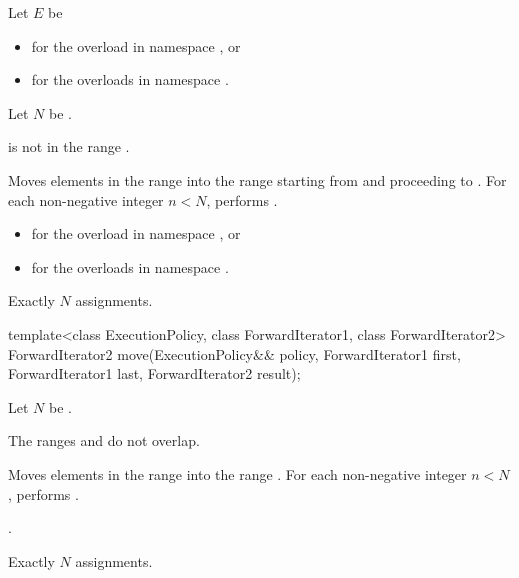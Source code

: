 \begin{itemdescr}
\pnum
Let $E$ be
\begin{itemize}
\item
  for the overload in namespace , or
\item
  for the overloads in namespace .
\end{itemize}
Let $N$ be .

\pnum
\expects
{} is not in the range .

\pnum
\effects
Moves elements in the range 
into the range 
starting from  and proceeding to .
For each non-negative integer $n < N$, performs .

\pnum
\returns
\begin{itemize}
\item
  for the overload in namespace , or
\item
  for the overloads in namespace .
\end{itemize}

\pnum
\complexity
Exactly $N$ assignments.
\end{itemdescr}

%
\begin{itemdecl}
template<class ExecutionPolicy, class ForwardIterator1, class ForwardIterator2>
  ForwardIterator2 move(ExecutionPolicy&& policy,
                        ForwardIterator1 first, ForwardIterator1 last,
                        ForwardIterator2 result);
\end{itemdecl}

\begin{itemdescr}
\pnum
Let $N$ be .

\pnum
\expects
The ranges  and 
do not overlap.

\pnum
\effects
Moves elements in the range 
into the range .
For each non-negative integer $n < N$,
performs .

\pnum
\returns
{}.

\pnum
\complexity
Exactly $N$ assignments.
\end{itemdescr}

